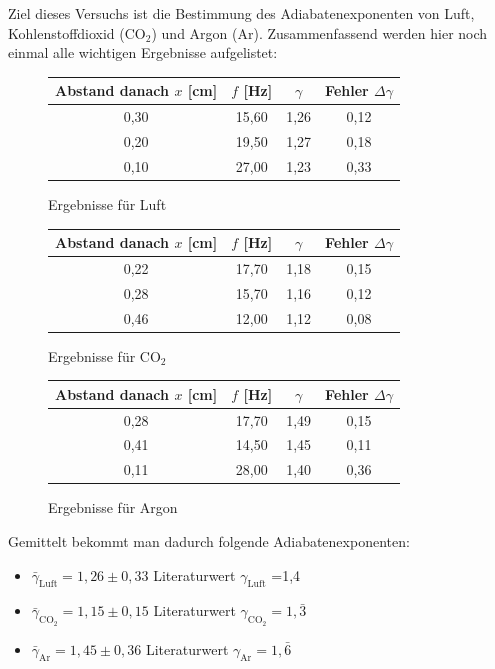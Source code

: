 \documentclass[fontsize=12pt]{scrartcl}
\begin{document}
Ziel dieses Versuchs ist die Bestimmung des Adiabatenexponenten von Luft, Kohlenstoffdioxid (CO$_2$) und Argon (Ar). Zusammenfassend werden hier noch einmal alle wichtigen Ergebnisse aufgelistet:
\begin{figure}[H]
\centering
\caption{Ergebnisse für Luft}
\begin{tabular}{|c|c|c|c|} \hline
 Abstand danach $x$ [cm] & $f$ [Hz] & $\gamma$ & Fehler  $\Delta \gamma$ \\ \hline
0,30	&15,60	&1,26	&0,12	\\ \hline
0,20	&19,50	&1,27	&0,18	\\ \hline
0,10	&27,00	&1,23	&0,33	\\ \hline
\end{tabular}				 
\end{figure}
\begin{figure}[H]
\vspace{-24pt}
\centering
\caption{Ergebnisse für CO$_2$}
\begin{tabular}{|c|c|c|c|} \hline
 Abstand danach $x$ [cm] & $f$ [Hz] & $\gamma$ & Fehler  $\Delta \gamma$\\ \hline
0,22	&17,70	&1,18	&0,15	\\ \hline
0,28	&15,70	&1,16	&0,12	\\ \hline
0,46	&12,00	&1,12	&0,08	\\ \hline
\end{tabular}				 
\end{figure}
\begin{figure}[H]
\vspace{-24pt}
\centering
\caption{Ergebnisse für Argon}
\begin{tabular}{|c|c|c|c|} \hline
 Abstand danach $x$ [cm] & $f$ [Hz] & $\gamma$ & Fehler  $\Delta \gamma$\\ \hline
0,28	&17,70	&1,49	&0,15	\\ \hline
0,41	&14,50	&1,45	&0,11	\\ \hline
0,11&	28,00	&1,40	&0,36	\\ \hline
\end{tabular}				 
\end{figure}
Gemittelt bekommt man dadurch folgende Adiabatenexponenten:
\begin{itemize}
\centering
\item[] $\bar{\gamma}_{\text{Luft}} =1,26\pm 0,33$ \hspace{50pt} Literaturwert $\gamma_{\text{Luft}}$ =1,4
\item[] $\bar{\gamma}_{\text{CO}_2} =1,15\pm 0,15$ \hspace{50pt} Literaturwert $\gamma_{\text{CO}_2} =1,\bar{3}$
\item[] $\bar{\gamma}_{\text{Ar}}=1,45\pm 0,36$ \hspace{50pt} Literaturwert $\gamma_{\text{Ar}} =1,\bar{6}$
\end{itemize}
\newpage
\end{document}

